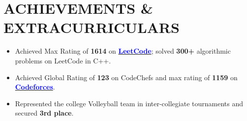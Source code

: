 \documentclass[letterpaper,10pt]{article}
\newcommand{\resumeItem}[1]{
  \item\small{
    {#1 \vspace{-5pt}}
  }
}
\begin{document}
 \section{ACHIEVEMENTS \& EXTRACURRICULARS}
          \begin{itemize}[leftmargin=0.15in]
                \resumeItem{Achieved Max Rating of \textbf{1614} on \href{https://leetcode.com/u/itsneerajkumar/}{\textcolor{blue}{\textbf{{LeetCode}}}}; solved \textbf{300+} algorithmic problems on LeetCode in C++.}
                \vspace{2pt}
                \resumeItem{Achieved Global Rating of \textbf{123} on CodeChefs and max rating of \textbf{1159} on \href{https://codeforces.com/profile/itsneerajkumar}{\textcolor{blue}{\textbf{{Codeforces}}}}.}
                \vspace{2pt}
                \resumeItem{Represented the college Volleyball team in inter-collegiate tournaments and secured \textbf{3rd place}.}
          \end{itemize}
 \vspace{-8pt}

 
 
\end{document}
